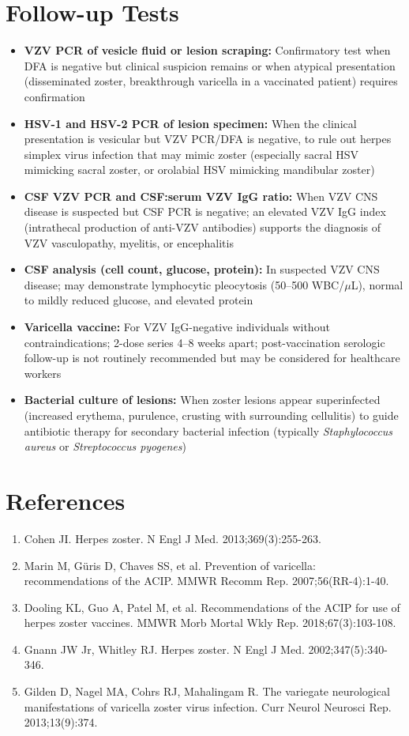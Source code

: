\section*{Follow-up Tests}
\begin{itemize}
  \item \textbf{VZV PCR of vesicle fluid or lesion scraping:} Confirmatory test when DFA is negative but clinical suspicion remains or when atypical presentation (disseminated zoster, breakthrough varicella in a vaccinated patient) requires confirmation
  \item \textbf{HSV-1 and HSV-2 PCR of lesion specimen:} When the clinical presentation is vesicular but VZV PCR/DFA is negative, to rule out herpes simplex virus infection that may mimic zoster (especially sacral HSV mimicking sacral zoster, or orolabial HSV mimicking mandibular zoster)
  \item \textbf{CSF VZV PCR and CSF:serum VZV IgG ratio:} When VZV CNS disease is suspected but CSF PCR is negative; an elevated VZV IgG index (intrathecal production of anti-VZV antibodies) supports the diagnosis of VZV vasculopathy, myelitis, or encephalitis
  \item \textbf{CSF analysis (cell count, glucose, protein):} In suspected VZV CNS disease; may demonstrate lymphocytic pleocytosis (50--500 WBC/$\mu$L), normal to mildly reduced glucose, and elevated protein
  \item \textbf{Varicella vaccine:} For VZV IgG-negative individuals without contraindications; 2-dose series 4--8 weeks apart; post-vaccination serologic follow-up is not routinely recommended but may be considered for healthcare workers
  \item \textbf{Bacterial culture of lesions:} When zoster lesions appear superinfected (increased erythema, purulence, crusting with surrounding cellulitis) to guide antibiotic therapy for secondary bacterial infection (typically \textit{Staphylococcus aureus} or \textit{Streptococcus pyogenes})
\end{itemize}

\section*{References}
\begin{enumerate}
  \item Cohen JI. Herpes zoster. N Engl J Med. 2013;369(3):255-263.
  \item Marin M, Güris D, Chaves SS, et al. Prevention of varicella: recommendations of the ACIP. MMWR Recomm Rep. 2007;56(RR-4):1-40.
  \item Dooling KL, Guo A, Patel M, et al. Recommendations of the ACIP for use of herpes zoster vaccines. MMWR Morb Mortal Wkly Rep. 2018;67(3):103-108.
  \item Gnann JW Jr, Whitley RJ. Herpes zoster. N Engl J Med. 2002;347(5):340-346.
  \item Gilden D, Nagel MA, Cohrs RJ, Mahalingam R. The variegate neurological manifestations of varicella zoster virus infection. Curr Neurol Neurosci Rep. 2013;13(9):374.
\end{enumerate}

\clearpage
